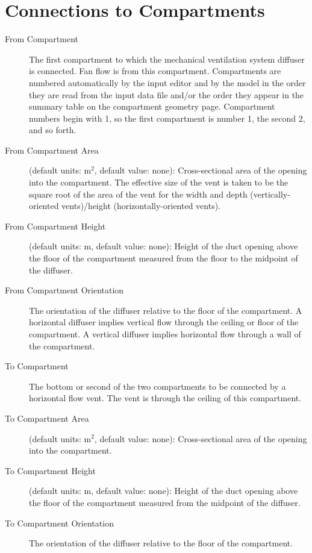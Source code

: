 \section{Connections to Compartments}

\begin{description}
\item[From Compartment] The first compartment to which the mechanical ventilation system diffuser is connected. Fan flow is from this compartment.  Compartments are numbered automatically by the input editor and by the model in the order they are read from the input data file and/or the order they appear in the summary table on the compartment geometry page. Compartment numbers begin with 1, so the first compartment is number 1, the second 2, and so forth.

\item[From Compartment Area] (default units: m$^2$, default value: none): Cross-sectional area of the opening into the compartment. The effective size of the vent is taken to be the square root of the area of the vent for the width and depth (vertically-oriented vents)/height (horizontally-oriented vents). 

\item[From Compartment Height] (default units: m, default value: none): Height of the duct opening above the floor of the compartment measured from the floor to the midpoint of the diffuser.

\item[From Compartment Orientation] The orientation of the diffuser relative to the floor of the compartment.  A horizontal diffuser implies vertical flow through the ceiling or floor of the compartment.  A vertical diffuser implies horizontal flow through a wall of the compartment.

\item[To Compartment] The bottom or second of the two compartments to be connected by a horizontal flow vent. The vent is through the ceiling of this compartment. 

\item[To Compartment Area] (default units: m$^2$, default value: none): Cross-sectional area of the opening into the compartment. 

\item[To Compartment Height] (default units: m, default value: none): Height of the duct opening above the floor of the compartment measured from the midpoint of the diffuser.

\item[To Compartment Orientation] The orientation of the diffuser relative to the floor of the compartment.
\end{description}

